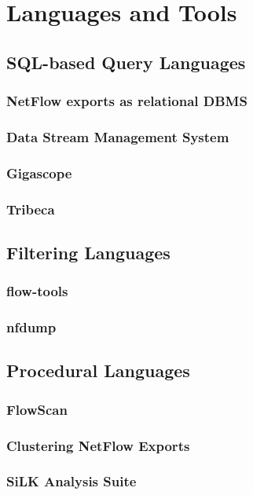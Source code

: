 \chapter{Languages and Tools}\label{ch:languages-and-tools}

\section{SQL-based Query Languages}\label{sec:sql-languages}
  \subsection{NetFlow exports as relational DBMS}\label{subsec:rdbms}
  \subsection{Data Stream Management System}\label{subsec:dsms}
  \subsection{Gigascope}\label{subsec:gigascope}
  \subsection{Tribeca}\label{subsec:tribeca}

\section{Filtering Languages}\label{sec:filtering-languages}
  \subsection{flow-tools}\label{subsec:flow-tools}
  \subsection{nfdump}\label{subsec:nfdump}

\section{Procedural Languages}\label{sec:procedural-languages}
  \subsection{FlowScan}\label{subsec:flowscan}
  \subsection{Clustering NetFlow Exports}\label{subsec:clustered-netflow}
  \subsection{SiLK Analysis Suite}\label{subsec:silk}